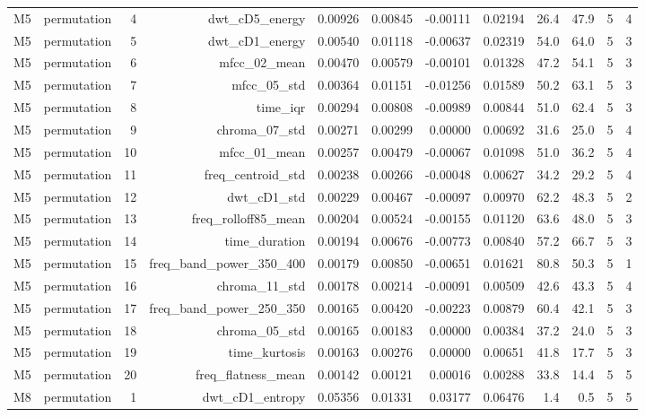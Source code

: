 \begin{table}[htbp]
\begin{tabular}{lrrrrrrrrrrr}
    M5 & permutation & 4 & dwt\_cD5\_energy & 0.00926 & 0.00845 & -0.00111 & 0.02194 & 26.4 & 47.9 & 5 & 4 \\
    M5 & permutation & 5 & dwt\_cD1\_energy & 0.00540 & 0.01118 & -0.00637 & 0.02319 & 54.0 & 64.0 & 5 & 3 \\
    M5 & permutation & 6 & mfcc\_02\_mean & 0.00470 & 0.00579 & -0.00101 & 0.01328 & 47.2 & 54.1 & 5 & 3 \\
    M5 & permutation & 7 & mfcc\_05\_std & 0.00364 & 0.01151 & -0.01256 & 0.01589 & 50.2 & 63.1 & 5 & 3 \\
    M5 & permutation & 8 & time\_iqr & 0.00294 & 0.00808 & -0.00989 & 0.00844 & 51.0 & 62.4 & 5 & 3 \\
    M5 & permutation & 9 & chroma\_07\_std & 0.00271 & 0.00299 & 0.00000 & 0.00692 & 31.6 & 25.0 & 5 & 4 \\
    M5 & permutation & 10 & mfcc\_01\_mean & 0.00257 & 0.00479 & -0.00067 & 0.01098 & 51.0 & 36.2 & 5 & 4 \\
    M5 & permutation & 11 & freq\_centroid\_std & 0.00238 & 0.00266 & -0.00048 & 0.00627 & 34.2 & 29.2 & 5 & 4 \\
    M5 & permutation & 12 & dwt\_cD1\_std & 0.00229 & 0.00467 & -0.00097 & 0.00970 & 62.2 & 48.3 & 5 & 2 \\
    M5 & permutation & 13 & freq\_rolloff85\_mean & 0.00204 & 0.00524 & -0.00155 & 0.01120 & 63.6 & 48.0 & 5 & 3 \\
    M5 & permutation & 14 & time\_duration & 0.00194 & 0.00676 & -0.00773 & 0.00840 & 57.2 & 66.7 & 5 & 3 \\
    M5 & permutation & 15 & freq\_band\_power\_350\_400 & 0.00179 & 0.00850 & -0.00651 & 0.01621 & 80.8 & 50.3 & 5 & 1 \\
    M5 & permutation & 16 & chroma\_11\_std & 0.00178 & 0.00214 & -0.00091 & 0.00509 & 42.6 & 43.3 & 5 & 4 \\
    M5 & permutation & 17 & freq\_band\_power\_250\_350 & 0.00165 & 0.00420 & -0.00223 & 0.00879 & 60.4 & 42.1 & 5 & 3 \\
    M5 & permutation & 18 & chroma\_05\_std & 0.00165 & 0.00183 & 0.00000 & 0.00384 & 37.2 & 24.0 & 5 & 3 \\
    M5 & permutation & 19 & time\_kurtosis & 0.00163 & 0.00276 & 0.00000 & 0.00651 & 41.8 & 17.7 & 5 & 3 \\
    M5 & permutation & 20 & freq\_flatness\_mean & 0.00142 & 0.00121 & 0.00016 & 0.00288 & 33.8 & 14.4 & 5 & 5 \\
    M8 & permutation & 1 & dwt\_cD1\_entropy & 0.05356 & 0.01331 & 0.03177 & 0.06476 & 1.4 & 0.5 & 5 & 5 \\

\end{tabular}
\end{table}
